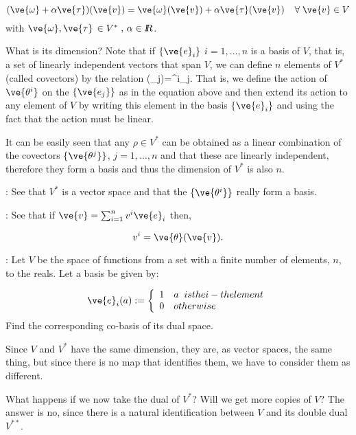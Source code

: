 \[
(\ve{\omega}+\alpha \ve{\tau})(\ve{ v})=
\ve{\omega}(\ve{ v})+\alpha \ve{\tau}(\ve{ v})\;\;\;\;\forall\;\ve{v}\in V
\]
%
with  $\ve{\omega},\ve{\tau}\,\in V^*\;,\,\alpha \in \re$. 

What is its dimension? 
Note that if
$\{\ve{ e}_i\}$ $i=1,\ldots,n$ is a basis of $V$, that is, a set
of linearly independent vectors that span $V$, we can define $n$
elements of $V^*$ (called covectors) by the relation 
\beq
{}(_j)=\delta^i_{\;j}.
\eeq
That is, we define the action of $\ve{ \theta^i}$ on the $\{\ve{e_j}\}$
as in the equation above and then extend its action to any
element of $V$ by writing this element in the basis $\{\ve{ e}_i\}$
and using the fact that the action must be linear.
  
It can be easily seen that any $\rho \in V^*$ can be obtained
as a linear combination of the covectors $\{\ve{\theta^j}\}$,
$j=1,\ldots,n$ and that these are linearly independent, therefore
they form a basis and thus the dimension of $V^*$ is also $n$.
\espa

\ejer: See that $V^*$ is a vector space and that the $\{\ve{ \theta^i}\}$
really form a basis.

\ejer: See that if $\ve{v} = \sum_{i=1}^{n} v^i \ve{e}_i$ then,

\[
v^i = \ve{\theta}(\ve{v}).
\]

\ejer:
Let $V$ be the space of functions from a set with a finite number of elements, $n$, to the reals.
Let a basis be given by:

\[
\ve{e}_i (a) := \left\{
\begin{array}{cl}
1 & a \;\; is the i-th element \\
0 & otherwise
\end{array}
\right.
\]
%
Find the corresponding co-basis of its dual space. 

Since $V$ and $V^*$ have the same dimension, they are, as vector
spaces, the same thing, but since there is no map that identifies them,
we have to consider them as different. 

What happens if we now take the dual of $V^*$? Will we get more
copies of $V$? The answer is no, since there is a natural identification
between $V$ and its double dual $V^{**}$.

